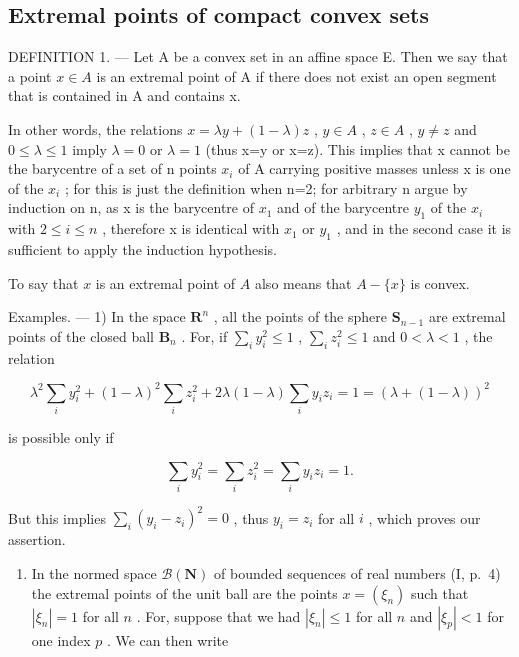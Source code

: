 \subsection{Extremal points of compact convex sets}

DEFINITION 1. --- Let A be a convex set in an affine space E. Then we say that a point \(x \in A\) is an extremal point of A if there does not exist an open segment that is contained in A and contains x.

In other words, the relations \(x=\lambda y+(1-\lambda)z\) , \(y\in A\) , \(z\in A\) , \(y\neq z\) and \(0\leqslant\lambda\leqslant1\) imply \(\lambda=0\) or \(\lambda=1\) (thus x=y or x=z). This implies that x cannot be the barycentre of a set of n points \(x_{i}\) of A carrying positive masses unless x is one of the \(x_{i}\) ; for this is just the definition when n=2; for arbitrary n argue by induction on n, as x is the barycentre of \(x_{1}\) and of the barycentre \(y_{1}\) of the \(x_{i}\) with \(2\leqslant i\leqslant n\) , therefore x is identical with \(x_{1}\) or \(y_{1}\) , and in the second case it is sufficient to apply the induction hypothesis.

To say that \(x\) is an extremal point of \(A\) also means that \(A - \{x\}\) is convex.

Examples. --- 1) In the space \(\mathbf{R}^n\) , all the points of the sphere \(\mathbf{S}_{n-1}\) are extremal points of the closed ball \(\mathbf{B}_n\) . For, if \(\sum_{i} y_i^2 \leqslant 1\) , \(\sum_{i} z_i^2 \leqslant 1\) and \(0 < \lambda < 1\) , the relation

\[
\lambda^ {2} \sum_ {i} y _ {i} ^ {2} + (1 - \lambda) ^ {2} \sum_ {i} z _ {i} ^ {2} + 2 \lambda (1 - \lambda) \sum_ {i} y _ {i} z _ {i} = 1 = (\lambda + (1 - \lambda)) ^ {2}
\]

is possible only if

\[
\sum_ {i} y _ {i} ^ {2} = \sum_ {i} z _ {i} ^ {2} = \sum_ {i} y _ {i} z _ {i} = 1.
\]

But this implies \(\sum_{i}(y_i - z_i)^2 = 0\) , thus \(y_i = z_i\) for all \(i\) , which proves our assertion.

\begin{enumerate}
\def\labelenumi{\arabic{enumi})}
\setcounter{enumi}{1}
\tightlist
\item
  In the normed space \(\mathcal{B}(\mathbf{N})\) of bounded sequences of real numbers (I, p.~4) the extremal points of the unit ball are the points \(x = (\xi_n)\) such that \(|\xi_n| = 1\) for all \(n\) . For, suppose that we had \(|\xi_n| \leqslant 1\) for all \(n\) and \(|\xi_p| < 1\) for one index \(p\) . We can then write
\end{enumerate}

